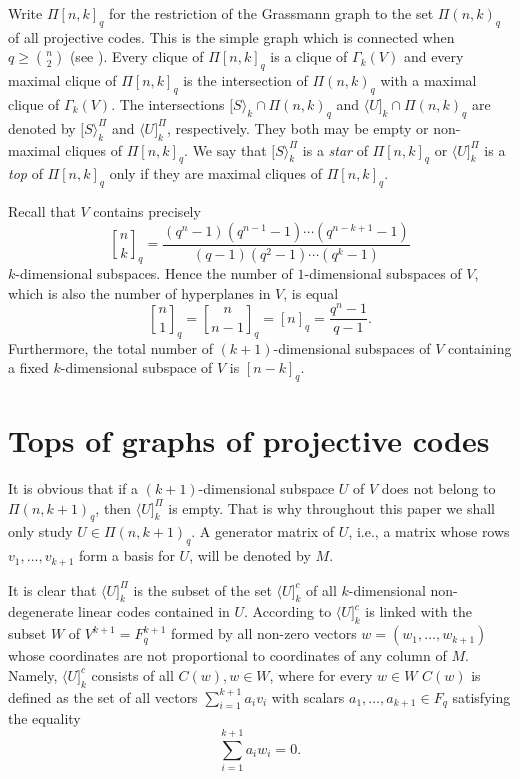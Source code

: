 \documentclass[12pt]{article}
\theoremstyle{definition}
\begin{document}
Write $\Pi[n, k]_q$  for the restriction of the  Grassmann graph to the set $\Pi(n, k)_q$ of all projective codes. This is the simple  graph  which is connected when $q\geq \binom{n}{2}$ (see \cite[Theorem 1]{KP3}).
Every clique of $\Pi[n, k]_q$ is a  clique of $\Gamma_{k}(V)$ and  every maximal clique of $\Pi[n, k]_q$ is
 the intersection of $\Pi(n,k)_{q}$ with a maximal clique of $\Gamma_{k}(V)$.
The intersections $[S\rangle_{k}\cap{\Pi}(n,k)_q$ and $\langle U]_{k}\cap{\Pi}(n,k)_q$ are denoted by $[S\rangle^{\Pi}_{k}$ and $\langle U]^{\Pi}_{k}$, respectively.
They both
may be empty or  non-maximal cliques of $\Pi[n, k]_q$. We say that $[S\rangle^{\Pi}_{k}$ is a {\it star} of $\Pi[n, k]_q$ or $\langle U]^{\Pi}_{k}$ is a {\it top} of $\Pi[n, k]_q$ only if they are maximal cliques of $\Pi[n, k]_q$.

Recall that $V$ contains precisely
$$\genfrac{[}{]}{0pt}{}{n}{k}_q=
\frac{(q^n-1)(q^{n-1}-1)\cdots(q^{n-k+1}-1)}{(q-1)(q^2-1)\cdots(q^k-1)}$$
$k$-dimensional subspaces. Hence the number of $1$-dimensional subspaces of $V$, which is also the number of hyperplanes in $V$, is equal
$$\genfrac{[}{]}{0pt}{}{n}{1}_q=\genfrac{[}{]}{0pt}{}{n}{n-1}_q=
[n]_{q}=\frac{q^n-1}{q-1}.$$
Furthermore, the total number of $(k+1)$-dimensional subspaces of $V$ containing a fixed $k$-dimensional subspace of $V$ is  $[n-k]_q$.

\section{Tops of graphs of projective codes}%

It is obvious that if a $(k+1)$-dimensional subspace $U$ of $V$ does not belong to $\Pi(n,k+1)_q$, then $\langle U]^{\Pi}_{k}$ is empty. That is why throughout this paper we shall only study $U\in \Pi(n,k+1)_q$. A generator matrix of $U$, i.e., a matrix whose rows $v_{1},\dots,v_{k+1}$  form a basis for $U$, will be denoted by $M$.

It is clear that $\langle U]^{\Pi}_{k}$ is the subset of the set $\langle U]^{c}_{k}$ of all $k$-dimensional non-degenerate linear codes contained in $U$. According to \cite{KP2} $\langle U]^{c}_{k}$ is linked with the subset $W$ of $V^{k+1}=F_{q}^{k+1}$ formed by all non-zero vectors $w=(w_{1},\dots,w_{k+1})$ whose coordinates are not proportional to coordinates of any column of $M$. Namely,  $\langle U]^{c}_{k}$ consists of all $C(w), w\in W$, where  for every $w\in W$ $C(w)$ is defined  as the set of all
vectors $\sum^{k+1}_{i=1}a_{i}v_{i}$ with scalars $a_{1},\dots, a_{k+1}\in F_q$ satisfying the equality
$$\sum^{k+1}_{i=1}a_{i}w_{i}=0.$$
\end{document}

